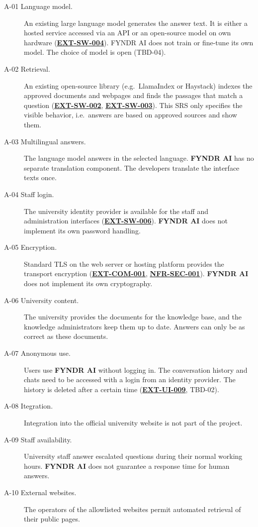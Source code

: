 \documentclass[11pt, a4paper]{article}
\newcommand{\reqref}[1]{\hyperref[req:#1]{\textbf{#1}}}
\begin{document}
\begin{description}
    \item[A-01 Language model.] An existing large language model generates the answer text. It is either a hosted service accessed via an API or an open-source model on own hardware (\reqref{EXT-SW-004}). FYNDR AI does not train or fine-tune its own model. The choice of model is open (TBD-04).
    \item[A-02 Retrieval.] An existing open-source library (e.g.\ LlamaIndex or Haystack) indexes the approved documents and webpages and finds the passages that match a question (\reqref{EXT-SW-002}, \reqref{EXT-SW-003}). This SRS only specifies the visible behavior, i.e.\ answers are based on approved sources and show them.
    \item[A-03 Multilingual answers.] The language model answers in the selected language. \textbf{FYNDR AI} has no separate translation component. The developers translate the interface texts once.
    \item[A-04 Staff login.] The university identity provider is available for the staff and administration interfaces (\reqref{EXT-SW-006}). \textbf{FYNDR AI} does not implement its own password handling.
    \item[A-05 Encryption.] Standard TLS on the web server or hosting platform provides the transport encryption (\reqref{EXT-COM-001}, \reqref{NFR-SEC-001}). \textbf{FYNDR AI} does not implement its own cryptography.
    \item[A-06 University content.] The university provides the documents for the knowledge base, and the knowledge administrators keep them up to date. Answers can only be as correct as these documents.
    \item[A-07 Anonymous use.] Users use \textbf{FYNDR AI} without logging in. The conversation history and chats need to be accessed with a login from an identity provider. The history is deleted after a certain time (\reqref{EXT-UI-009}, TBD-02).
    \item[A-08 Itegration.] Integration into the official university website is not part of the project.
    \item[A-09 Staff availability.] University staff answer escalated questions during their normal working hours. \textbf{FYNDR AI} does not guarantee a response time for human answers.
    \item[A-10 External websites.] The operators of the allowlisted websites permit automated retrieval of their public pages.
\end{description}
\end{document}
